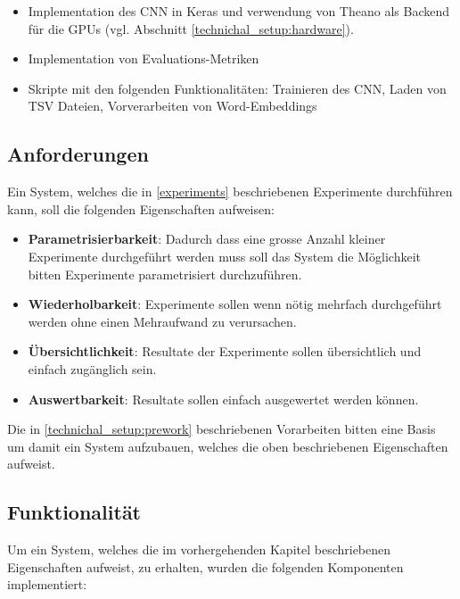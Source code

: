 \begin{itemize}[noitemsep]
	\item Implementation des CNN in Keras und verwendung von Theano \cite{theanoCitShort} als Backend für die GPUs (vgl. Abschnitt \ref{technichal_setup:hardware}).
	\item Implementation von Evaluations-Metriken
	\item Skripte mit den folgenden Funktionalitäten: Trainieren des CNN, Laden von TSV Dateien, Vorverarbeiten von Word-Embeddings
\end{itemize}

\subsection{Anforderungen}
\label{technical_setup:requirements}
Ein System, welches die in \ref{experiments} beschriebenen Experimente durchführen kann, soll die folgenden Eigenschaften aufweisen:

\begin{itemize}
	\item \textbf{Parametrisierbarkeit}: Dadurch dass eine grosse Anzahl kleiner Experimente durchgeführt werden muss soll das System die Möglichkeit bitten Experimente parametrisiert durchzuführen.
	\item \textbf{Wiederholbarkeit}: Experimente sollen wenn nötig mehrfach durchgeführt werden ohne einen Mehraufwand zu verursachen. 
	\item \textbf{Übersichtlichkeit}: Resultate der Experimente sollen übersichtlich und einfach zugänglich sein.
	\item \textbf{Auswertbarkeit}: Resultate sollen  einfach ausgewertet werden können.
\end{itemize}

Die in \ref{technichal_setup:prework} beschriebenen Vorarbeiten bitten eine Basis um damit ein System aufzubauen, welches die oben beschriebenen Eigenschaften aufweist.
\subsection{Funktionalität}
\label{technical_setup:functionality}
Um ein System, welches die im vorhergehenden Kapitel beschriebenen Eigenschaften aufweist, zu erhalten, wurden die folgenden Komponenten implementiert:

